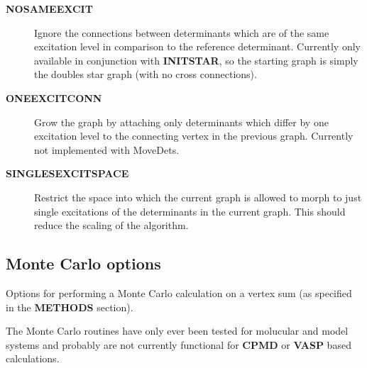 \documentclass[openany,a4paper,10pt]{manual}
\begin{document}
\begin{description}
\item[\textbf{NOSAMEEXCIT}]
Ignore the connections between determinants which are of the
same excitation level in comparison to the reference determinant.
Currently only available in conjunction with \textbf{INITSTAR}, so the
starting graph is simply the doubles star graph (with no cross
connections).

\item[\textbf{ONEEXCITCONN}]
Grow the graph by attaching only determinants which differ by one
excitation level to the connecting vertex in the previous graph.
Currently not implemented with MoveDets.

\item[\textbf{SINGLESEXCITSPACE}]
Restrict the space into which the current graph is allowed to morph
to just single excitations of the determinants in the current graph.
This should reduce the scaling of the algorithm.

\end{description}


\subsection{Monte Carlo options}

Options for performing a Monte Carlo calculation on a vertex sum (as
specified in the \textbf{METHODS} section).

The Monte Carlo routines have only ever been tested for molucular and
model systems and probably are not currently functional for \textbf{CPMD}
or \textbf{VASP} based calculations.
\end{document}
